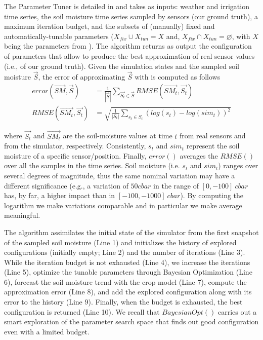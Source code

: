 The Parameter Tuner is detailed in  and takes as inputs: weather and irrigation time series, the soil moisture time series sampled by sensors (our ground truth), a maximum iteration budget, and the subsets of (manually) fixed and automatically-tunable parameters 
($X_{fix} \cup X_{tun} = X$ and, $X_{fix} \cap X_{tun} = \varnothing$, with $X$ being the parameters from ).
The algorithm returns as output the configuration of parameters that allow \olab{} to produce the best approximation of real sensor values (i.e., of our ground truth).
Given the simulation states \SMt{} and the sampled soil moisture $\overrightarrow{S}$, the error of approximating $\overrightarrow{S}$ with \SMt{} is computed as follows
\begin{align}\label{orchard-eq:error}
error(\overrightarrow{SM}, \overrightarrow{S}) &= \frac{1}{|\overrightarrow{S}|} \sum_{\overrightarrow{S_t} \in \overrightarrow{S}} RMSE(\overrightarrow{SM_t}, \overrightarrow{S_t})\\
RMSE(\overrightarrow{SM_t}, \overrightarrow{S_t}) &= \sqrt{\frac{1}{|S_t|} \sum_{s_t \in S_t} (log(s_t) - log(sim_t)) ^ 2}
\end{align}

where $\overrightarrow{S_t}$ and  $\overrightarrow{SM_t}$ are the soil-moisture values at time $t$ from real sensors and from the simulator, respectively. Consistently, $s_t$ and $sim_t$ represent the soil moisture of a specific sensor/position. Finally, $error()$ averages the $RMSE()$ over all the samples in the time series. Soil moisture (i.e. $s_t$ and $sim_t$) ranges over several degrees of magnitude, thus the same nominal variation may have a different significance (e.g., a variation of $50cbar$ in the range of $[0, -100]~cbar$ has, by far, a higher impact  than in $[-100, -1000]~cbar$). By computing the logarithm we make variations comparable and in particular we make average meaningful.

The algorithm assimilates the initial state of the simulator from the first snapshot of the sampled soil moisture (Line 1) and initializes the history of explored configurations (initially empty; Line 2) and the number of iterations (Line 3).
While the iteration budget is not exhausted (Line 4), 
we increase the iterations (Line 5),
optimize the tunable parameters through Bayesian Optimization (Line 6),
forecast the soil moisture trend with the crop model (Line 7),
compute the approximation error (Line 8),
and add the explored configuration along with its error to the history (Line 9).
Finally, when the budget is exhausted, the best configuration is returned (Line 10). We recall that $BayesianOpt()$ carries out a smart exploration of the parameter search space that finds out good configuration even with a limited budget.

